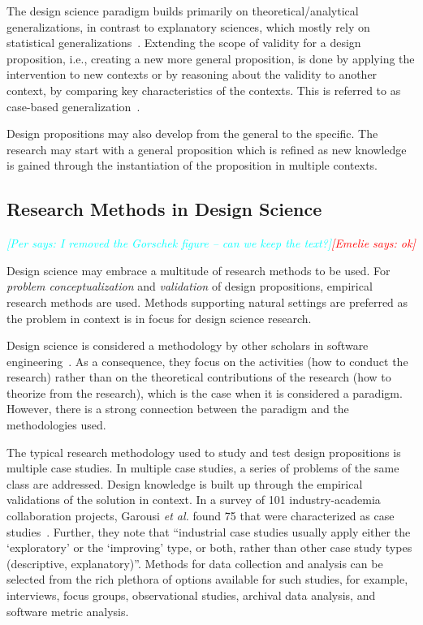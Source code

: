 \documentclass[graybox]{svmult}
\newcommand{\emelie}[1]{\textcolor{red}{{\it [Emelie says: #1]}}}
\newcommand{\peggy}[1]{\textcolor{blue}{{\it [Peggy says: #1]}}}
\newcommand{\per}[1]{\textcolor{cyan}{{\it [Per says: #1]}}}
\newcommand{\emelie}[1]{}
\newcommand{\peggy}[1]{}
\newcommand{\per}[1]{}
\begin{document}
The design science paradigm builds primarily on theoretical/analytical generalizations, in contrast to explanatory sciences, which mostly rely on statistical generalizations~\cite[p. 30]{Runeson12Case}. Extending the scope of validity for a design proposition, i.e., creating a new more general proposition, is done by applying the intervention to new contexts or by reasoning about the validity to another context, by comparing key characteristics of the contexts. This is referred to as case-based generalization~\cite{wieringa_six_2015}.  

Design propositions may also develop from the general to the specific. The research may start with a general proposition which is refined as new knowledge is gained through the instantiation of the proposition in multiple contexts. 


\subsection{Research Methods in Design Science} 
\per{I removed the Gorschek figure -- can we keep the text?}\emelie{ok}

Design science may embrace a multitude of research methods to be used. For \emph{problem conceptualization} and \emph{validation} of design propositions, empirical research methods are used. Methods supporting natural settings are preferred as the problem in context is in focus for design science research. 

Design science is considered a methodology by other scholars in software engineering~\cite{Wohlin2015}. As a consequence, they focus on the %
activities (how to conduct the research) rather than on the theoretical contributions of the research (how to theorize from the research), which is the case when it is considered a paradigm. However, %
there is a strong connection between the paradigm and the methodologies used.%


The typical research methodology used to study and test design propositions is multiple case studies. In multiple case studies, a series of problems of the same class are addressed. Design knowledge is built up through the empirical validations of the solution in context. 
In a survey of 101 industry-academia collaboration projects, Garousi \emph{et al.} found 75 that were characterized as case studies~\cite{Garousi2019}. Further, they note that ``industrial case studies usually apply either the `exploratory' or the `improving' type, or both, rather than other case study types (descriptive, explanatory)''. Methods for data collection and analysis can be selected from the rich plethora of options available for such studies, for example, interviews, focus groups, observational studies, archival data analysis, and software metric analysis. 
\end{document}

